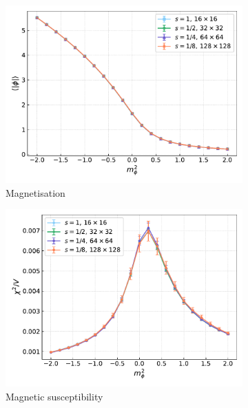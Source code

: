 \begin{figure}[hbp]
    \centering
    \begin{subfigure}[b]{0.45\textwidth}
        \includegraphics[width=\textwidth]{figures/cooling/mass_scan/magnetisation.pdf}
        \caption{Magnetisation}
    \end{subfigure}
    \hfill
    \begin{subfigure}[b]{0.45\textwidth}
        \includegraphics[width=\textwidth]{figures/cooling/mass_scan/susceptibility.pdf}
        \caption{Magnetic susceptibility}
    \end{subfigure}
    \\
    \vspace{10pt}
    \begin{subfigure}[b]{0.45\textwidth}

\end{subfigure}
\end{figure}

